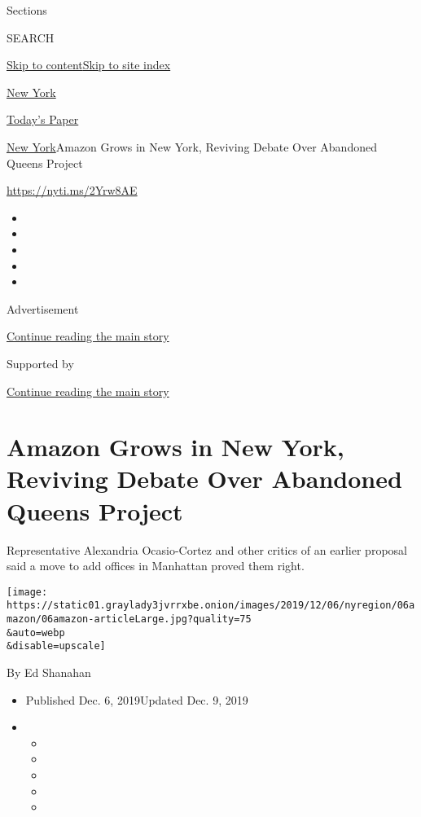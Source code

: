 Sections

SEARCH

\protect\hyperlink{site-content}{Skip to
content}\protect\hyperlink{site-index}{Skip to site index}

\href{https://www.nytimes3xbfgragh.onion/section/nyregion}{New York}

\href{https://myaccount.nytimes3xbfgragh.onion/auth/login?response_type=cookie\&client_id=vi}{}

\href{https://www.nytimes3xbfgragh.onion/section/todayspaper}{Today's
Paper}

\href{/section/nyregion}{New York}\textbar{}Amazon Grows in New York,
Reviving Debate Over Abandoned Queens Project

\url{https://nyti.ms/2Yrw8AE}

\begin{itemize}
\item
\item
\item
\item
\item
\end{itemize}

Advertisement

\protect\hyperlink{after-top}{Continue reading the main story}

Supported by

\protect\hyperlink{after-sponsor}{Continue reading the main story}

\hypertarget{amazon-grows-in-new-york-reviving-debate-over-abandoned-queens-project}{%
\section{Amazon Grows in New York, Reviving Debate Over Abandoned Queens
Project}\label{amazon-grows-in-new-york-reviving-debate-over-abandoned-queens-project}}

Representative Alexandria Ocasio-Cortez and other critics of an earlier
proposal said a move to add offices in Manhattan proved them right.

\texttt{[image: https://static01.graylady3jvrrxbe.onion/images/2019/12/06/nyregion/06amazon/06amazon-articleLarge.jpg?quality=75\\\&auto=webp\\\&disable=upscale]}

By Ed Shanahan

\begin{itemize}
\item
  Published Dec. 6, 2019Updated Dec. 9, 2019
\item
  \begin{itemize}
  \item
  \item
  \item
  \item
  \item
  \end{itemize}
\end{itemize}

